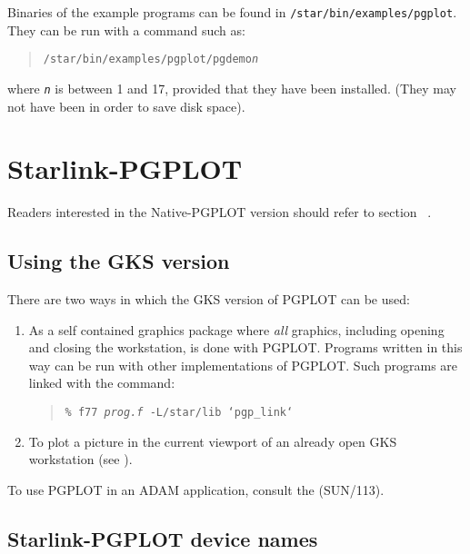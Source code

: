 \documentclass[twoside,11pt,nolof]{starlink}
\begin{document}
Binaries of the example programs can be found in
\texttt{/star/bin/examples/pgplot}.
They can be run with a command such as:

\begin{quote}
\texttt{/star/bin/examples/pgplot/pgdemo{\emph{n}}}
\end{quote}

where \texttt{\emph{n}} is between 1 and 17, provided that they have
been installed.  (They may not have been in order to save disk space).

\section{Starlink-PGPLOT}
\label{starlink-pgplot}

Readers interested in the Native-PGPLOT version should refer to
section~\latexhtml{\ref{native-pgplot}} %
{}.

\subsection{Using the GKS version}
\label{using_the_gks_version}

There are two ways in which the GKS version of PGPLOT can be used:

\begin{enumerate}

\item As a self contained graphics package where \emph{all} graphics, including
opening and closing the workstation, is done with PGPLOT. Programs written in
this way can be run with other implementations of PGPLOT. Such programs
are linked with the command:

\begin{quote}
\texttt{\% f77 \emph{prog.f} -L/star/lib `pgp\_link`}
\end{quote}

\item To plot a picture in the current viewport of an already open GKS
workstation (see  %
{}).
\end{enumerate}

To use PGPLOT in an ADAM application, consult the
 (SUN/113).

\subsection{Starlink-PGPLOT device names}
\label{starlink-pgplot_device_names}
\end{document}
